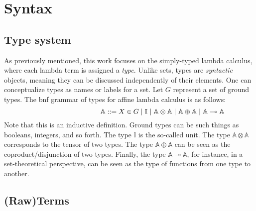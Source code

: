 

\section{Syntax}

\subsection{Type system}

As previously mentioned, this work focuses on the simply-typed lambda calculus, where each lambda term is assigned a \emph{type}. Unlike sets, types are \emph{syntactic} objects, meaning they can be discussed independently of their elements. One can conceptualize types as names or labels for a set. Let $G$ represent a set of ground types. The \acrfull{bnf} grammar of types for affine lambda calculus is as follows:
\begin{equation} \label{eq:grammartypes}
\centering
\hspace{95pt} \mathbb{A} ::= X \in G \hspace{3 pt} \vert \hspace{3 pt} \mathbb{I}  \hspace{3 pt}  \vert \hspace{3 pt} \mathbb{A}  \otimes  \mathbb{A} \hspace{3 pt}  \vert \hspace{3 pt} \mathbb{A}  \oplus  \mathbb{A} \hspace{3 pt} \vert  \hspace{3 pt}  \mathbb{A} \multimap  \mathbb{A}
\end{equation}
Note that this is an inductive definition. Ground types can be such things as booleans, integers, and so forth. The type $\mathbb{I}$ is the so-called unit. The type $\mathbb{A} \otimes \mathbb{A}$ corresponds to the tensor of two types. The type $\mathbb{A} \oplus \mathbb{A}$ can be seen as the coproduct/disjunction of two types. Finally, the type $\mathbb{A} \multimap \mathbb{A}$, for instance, in a set-theoretical perspective, can be seen as the type of functions from one type to another.


\subsection{(Raw)Terms}


